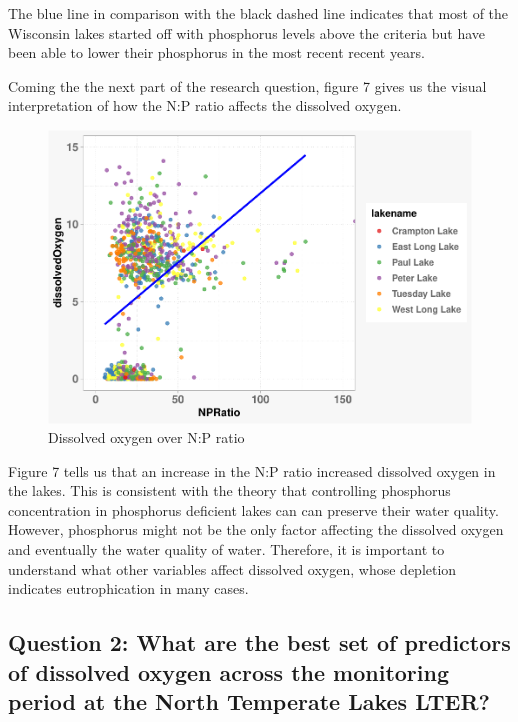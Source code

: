 \documentclass[12pt,]{article}
\begin{document}
The blue line in comparison with the black dashed line indicates that
most of the Wisconsin lakes started off with phosphorus levels above the
criteria but have been able to lower their phosphorus in the most recent
recent years.

Coming the the next part of the research question, figure 7 gives us the
visual interpretation of how the N:P ratio affects the dissolved oxygen.

\begin{figure}
\centering
\includegraphics{Eadala_ENV872_Project_files/figure-latex/fig7-1.pdf}
\caption{Dissolved oxygen over N:P ratio}
\end{figure}

Figure 7 tells us that an increase in the N:P ratio increased dissolved
oxygen in the lakes. This is consistent with the theory that controlling
phosphorus concentration in phosphorus deficient lakes can can preserve
their water quality. However, phosphorus might not be the only factor
affecting the dissolved oxygen and eventually the water quality of
water. Therefore, it is important to understand what other variables
affect dissolved oxygen, whose depletion indicates eutrophication in
many cases.

\hypertarget{question-2-what-are-the-best-set-of-predictors-of-dissolved-oxygen-across-the-monitoring-period-at-the-north-temperate-lakes-lter}{%
\subsection{Question 2: What are the best set of predictors of dissolved
oxygen across the monitoring period at the North Temperate Lakes
LTER?}\label{question-2-what-are-the-best-set-of-predictors-of-dissolved-oxygen-across-the-monitoring-period-at-the-north-temperate-lakes-lter}}
\end{document}
